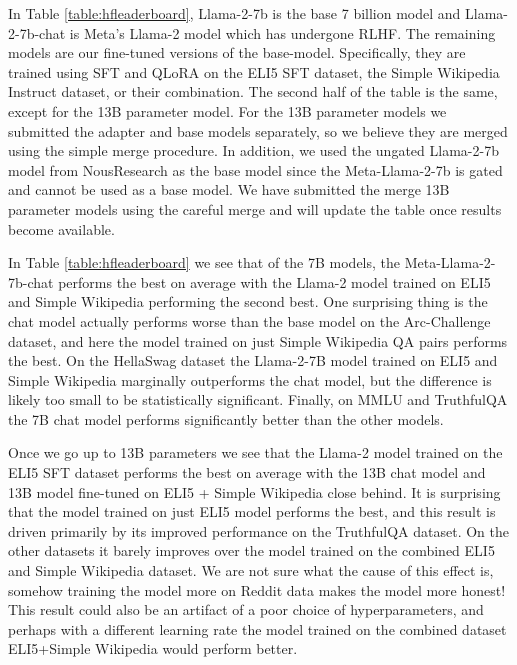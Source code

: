 \documentclass[11pt, oneside]{article}   	%
\begin{document}
In Table \ref{table:hfleaderboard}, Llama-2-7b is the base 7 billion model and Llama-2-7b-chat is Meta's Llama-2 model which has undergone RLHF.
The remaining models are our fine-tuned versions of the base-model. 
Specifically, they are trained using SFT and QLoRA on the ELI5 SFT dataset, the Simple Wikipedia Instruct dataset, or their combination. The second half of the table is the same, except for the 13B parameter model.
For the 13B parameter models we submitted the adapter and base models separately, so we believe they are merged using the simple merge procedure.
In addition, we used the ungated Llama-2-7b model from NousResearch as the base model since the Meta-Llama-2-7b is gated and cannot be used as a base model.
We have submitted the merge 13B parameter models using the careful merge and will update the table once results become available.

In Table \ref{table:hfleaderboard} we see that of the 7B models, the Meta-Llama-2-7b-chat performs the best on average with the Llama-2 model trained on ELI5 and Simple Wikipedia performing the second best.
One surprising thing is the chat model actually performs worse than the base model on the Arc-Challenge dataset, and here the model trained on just Simple Wikipedia QA pairs performs the best. 
On the HellaSwag dataset the Llama-2-7B model trained on ELI5 and Simple Wikipedia marginally outperforms the chat model, but the difference is likely too small to be statistically significant.
Finally, on MMLU and TruthfulQA the 7B chat model performs significantly better than the other models.

Once we go up to 13B parameters we see that the Llama-2 model trained on the ELI5 SFT dataset performs the best on average with the 13B chat model and 13B model fine-tuned on ELI5 + Simple Wikipedia close behind.
It is surprising that the model trained on just ELI5 model performs the best, and this result is driven primarily by its improved performance on the TruthfulQA dataset. 
On the other datasets it barely improves over the model trained on the combined ELI5 and Simple Wikipedia dataset.
We are not sure what the cause of this effect is, somehow training the model more on Reddit data makes the model more honest!
This result could also be an artifact of a poor choice of hyperparameters, and perhaps with a different learning rate the model trained on the combined dataset ELI5+Simple Wikipedia would perform better.
\end{document}
